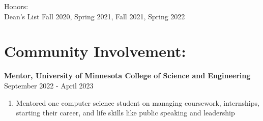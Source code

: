 \documentclass[10pt]{article}
\begin{document}
		\indent 
		{Honors: }\\
		\indent \indent
		{Dean's List} \hfill Fall 2020, Spring 2021, Fall 2021, Spring 2022
	
	\section*{Community Involvement: \hrulefill}
		\textbf{Mentor, University of Minnesota College of Science and Engineering} \hfill September 2022 - April 2023
		\begin{enumerate}[label=--]
			\item Mentored one computer science student on managing coursework, internships, starting their career, and life skills like public speaking and leadership
		\end{enumerate}
		
			
\end{document}
